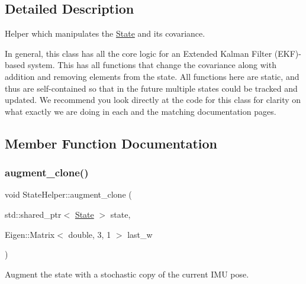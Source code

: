 \subsection{Detailed Description}
Helper which manipulates the \hyperlink{classov__msckf_1_1State}{State} and its covariance. 

In general, this class has all the core logic for an Extended Kalman Filter (E\+KF)-\/based system. This has all functions that change the covariance along with addition and removing elements from the state. All functions here are static, and thus are self-\/contained so that in the future multiple states could be tracked and updated. We recommend you look directly at the code for this class for clarity on what exactly we are doing in each and the matching documentation pages. 

\subsection{Member Function Documentation}
\mbox{\label{classov__msckf_1_1StateHelper_ade3a86a89f15cc6e03a6430fd1dee694}} 
\subsubsection{\texorpdfstring{augment\+\_\+clone()}{augment\_clone()}}
{\footnotesize\ttfamily void State\+Helper\+::augment\+\_\+clone (\begin{DoxyParamCaption}\item[{std\+::shared\+\_\+ptr$<$ \hyperlink{classov__msckf_1_1State}{State} $>$}]{state,  }\item[{Eigen\+::\+Matrix$<$ double, 3, 1 $>$}]{last\+\_\+w }\end{DoxyParamCaption})\hspace{0.3cm}{\ttfamily [static]}}



Augment the state with a stochastic copy of the current I\+MU pose. 

